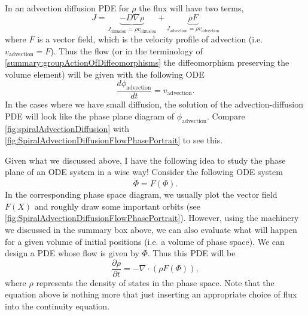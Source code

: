 \begin{summary}
	In an advection diffusion PDE for $ \rho $ the flux will have two terms, 
	\[ J = \underbrace{-D\nabla \rho}_{J_\text{diffusion} = \rho v_\text{diffusion}}+ \underbrace{\rho F}_{J_\text{advection} = \rho v_\text{advection}} \]
	where $ F $ is a vector field, which is the velocity profile of advection (i.e. $ v_\text{advection} = F $). Thus the flow (or in the terminology of \autoref{summary:groupActionOfDiffeomorphisms} the diffeomorphism preserving the volume element) will be given with the following ODE
	\[ \frac{d \phi_\text{advection}}{dt} = v_\text{advection}. \]
	In the cases where we have small diffusion, the solution of the advection-diffusion PDE will look like the phase plane diagram of $ \phi_\text{advection} $. Compare \autoref{fig:spiralAdvectionDiffusion} with  \autoref{fig:SpiralAdvectionDiffusionFlowPhasePortrait} to see this.
\end{summary}


\begin{observation}
	Given what we discussed above, I have the following idea to study the phase plane of an ODE system in a wise way! Consider the following ODE system
	\[ \dot{\Phi} = F(\Phi). \]
	In the corresponding phase space diagram, we usually plot the vector field $ F(X) $ and roughly draw some important orbits (see \autoref{fig:SpiralAdvectionDiffusionFlowPhasePortrait}). However, using the machinery we discussed in the summary box above, we can also evaluate what will happen for a given volume of initial positions (i.e. a volume of phase space). We can design a PDE whose flow is given by $ \Phi $. Thus this PDE will be
	\[ \frac{\partial \rho}{\partial t} = -\nabla\cdot(\rho F(\Phi)), \]
	where $ \rho $ represents the density of states in the phase space. Note that the equation above is nothing more that just inserting an appropriate choice of flux into the continuity equation.
\end{observation}


